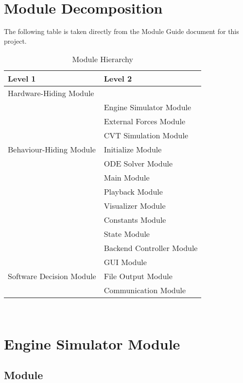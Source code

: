 \documentclass[12pt, titlepage]{article}
\begin{document}
\section{Module Decomposition}

The following table is taken directly from the Module Guide document for this project.

\begin{table}[h!]
\centering
\begin{tabular}{p{} p{}}
\toprule
\textbf{Level 1} & \textbf{Level 2}\\
\midrule

{Hardware-Hiding Module} & ~ \\
\midrule

\multirow{7}{0.3\textwidth}{Behaviour-Hiding Module}
& Engine Simulator Module\\
& External Forces Module\\
& CVT Simulation Module\\
& Initialize Module\\
& ODE Solver Module\\
& Main Module\\ 
& Playback Module\\
& Visualizer Module\\
& Constants Module\\
& State Module\\
& Backend Controller Module\\
\midrule

\multirow{3}{0.3\textwidth}{Software Decision Module}
& GUI Module\\
& File Output Module\\
& Communication Module\\
\bottomrule

\end{tabular}
\caption{Module Hierarchy}
\label{TblMH}
\end{table}

\newpage
~\newpage

\section{Engine Simulator Module} \label{Module_engine_simulator}

\subsection{Module}
\end{document}
